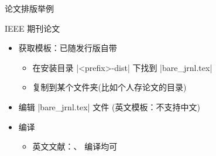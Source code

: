 \begin{frame}[fragile]{论文排版举例}
  \begin{exampleblock}{IEEE 期刊论文}
    \begin{itemize}
      \item 获取模板：已随发行版自带
            \begin{itemize}
              \item 在安装目录 |<prefix>\texlive{}\texmf-dist\doc\latex\IEEEtran|
                    下找到 |bare_jrnl.tex|
              \item 复制到某个文件夹(比如个人存论文的目录)
            \end{itemize}
      \item 编辑 |bare_jrnl.tex| 文件 (英文模板：不支持中文)
      \item 编译
            \begin{itemize}
              \item 英文文献：\XeLaTeX{}、\pdfLaTeX{} 编译均可
            \end{itemize}
    \end{itemize}
  \end{exampleblock}
\end{frame}